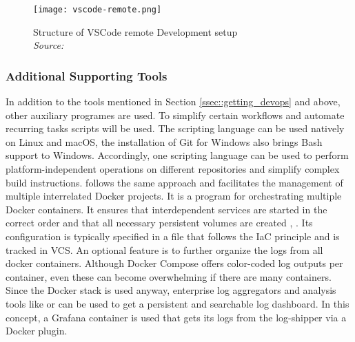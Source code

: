 \documentclass[12pt, a4paper]{article}
\begin{document}
        \begin{figure}[]
            \centering
            \texttt{[image: vscode-remote.png]}
            \caption{Structure of \ac{VSCode} remote Development setup \\\textit{Source:~\cite{vscodedevcontainer}}}\label{fig::vscoderemote}
        \end{figure}

        \subsubsection{Additional Supporting Tools}
        In addition to the tools mentioned in Section \ref{ssec::getting_devops} and above, other auxiliary programes are used. To simplify certain workflows and automate recurring tasks scripts will be used. The  scripting language can be used natively on Linux and macOS, the installation of Git for Windows also brings Bash support to Windows. Accordingly, one scripting language can be used to perform platform-independent operations on different repositories and simplify complex build instructions.  follows the same approach and facilitates the management of multiple interrelated Docker projects. It is a program for orchestrating multiple Docker containers. It ensures that interdependent services are started in the correct order and that all necessary persistent volumes are created \cite{docker2020}, \cite{dockerdocs}. Its configuration is typically specified in a  file that follows the \ac{IaC} principle and is tracked in \ac{VCS}. An optional feature is to further organize the logs from all docker containers. Although Docker Compose offers color-coded log outputs per container, even these can become overwhelming if there are many containers. Since the Docker stack is used anyway, enterprise log aggregators and analysis tools like  or  can be used to get a persistent and searchable log dashboard. In this concept, a Grafana container is used that gets its logs from the  log-shipper via a Docker plugin.
\end{document}
